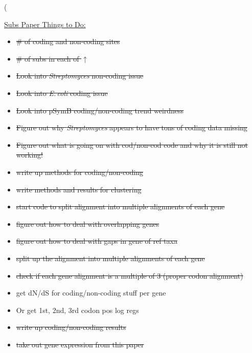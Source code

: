 \left( \documentclass[12pt]{article}
\newcommand{\strep}{\textit{Streptomyces}\xspace}
\newcommand{\ecol}{\textit{E.\,coli}\xspace}
\newcommand{\pb}{pSymB\xspace}
\begin{document}
\underline{Subs Paper Things to Do:}
\begin{itemize}
	\item \sout{ \# of coding and non-coding sites}
	
	\item \sout{\# of subs in each of $\uparrow$}
	
	\item \sout{Look into \strep non-coding issue}
	
	\item \sout{Look into \ecol coding issue}
	
	\item \sout{Look into \pb coding/non-coding trend weirdness}
	
	\item \sout{Figure out why \strep appears to have tons of coding data missing}
	
	\item \sout{Figure out what is going on with cod/non-cod code and why it is still not working!}
	
	\item \sout{write up methods for coding/non-coding}
	
	\item \sout{write methods and results for clustering}
	
	\item \sout{start code to split alignment into multiple alignments of each gene}
	
	\item \sout{figure out how to deal with overlapping genes}
	
	\item \sout{figure out how to deal with gaps in gene of ref taxa}
	
	\item \sout{split up the alignment into multiple alignments of each gene}
	
	\item \sout{check if each gene alignment is a multiple of 3 (proper codon alignment)}
	
	\item get dN/dS for coding/non-coding stuff per gene
	 
	\item Or get 1st, 2nd, 3rd codon pos log regs
	
	\item \sout{write up coding/non-coding results}
	
	\item \sout{take out gene expression from this paper}
	

\end{itemize}
\end{document}
